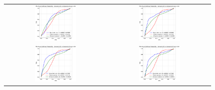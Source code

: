     \begin{figure}
        \centering
        \begin{tabular}{cc}
            \includegraphics[width = 0.42\textwidth, height= 0.3\textheight]{images/AUROC/MSP_cnc_1.pdf} & 
            \includegraphics[width = 0.42\textwidth, height= 0.3\textheight]{images/AUROC/MSP_cnc_5.pdf}\\ 
            \includegraphics[width = 0.42\textwidth, height= 0.3\textheight]{images/AUROC/MSP_cnc_10.pdf} &
            \includegraphics[width = 0.42\textwidth, height= 0.3\textheight]{images/AUROC/MSP_cnc_15.pdf} \\ 

\end{tabular}
\end{figure}
